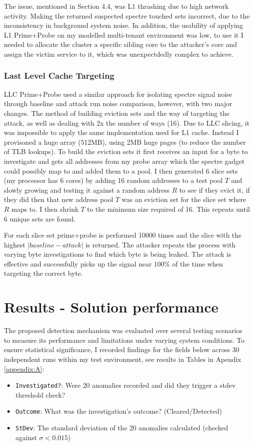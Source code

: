 \documentclass[11pt,a4paper, notitlepage]{article}
\begin{document}
The issue, mentioned in Section 4.4, was L1 thrashing due to high network activity. Making the returned suspected spectre touched sets incorrect, due to the 
inconsistency in background system noise. In addition, the usability of applying L1 Prime+Probe on my modelled multi-tenant environment was low, to use it I needed 
to allocate the cluster a specific sibling core to the attacker's core and assign the victim service to it, which was unexpectdedly complex to achieve.
\subsubsection{Last Level Cache Targeting}
LLC Prime+Probe used a similar approach for isolating spectre signal noise through baseline and attack run noise comparison, however, with two major changes.
The method of building eviction sets and the way of targeting the attack, as well as dealing with 2x the number of ways (16). Due to LLC slicing, it was impossible to apply the same implementation used for
L1 cache. Instead I provisoned a huge array (512MB), using 2MB huge pages (to reduce the number of TLB lookups). To build the eviction sets it 
first receives an input for a byte to investigate and gets all addresses from my probe array which the spectre gadget could possibly map to and added them to a pool. 
I then generated 6 slice sets (my processor has 6 cores) by adding 16 random addresses to a test pool $T$ and slowly growing and testing it against a random address $R$ to see if they evict it,
if they did then that new address pool $T$ was an eviction set for the slice set where $R$ maps to. I then shrink $T$ to the minimum size required of 16. This repeats until 6 unique sets are found.

For each slice set prime+probe is performed 10000 times and the slice with the highest $|baseline - attack|$ is returned. The attacker repeats
the process with varying byte investigations to find which byte is being leaked. The attack is effective and successfully picks up the
signal near 100\% of the time when targeting the correct byte. 

\section{Results - Solution performance}
The proposed detection mechanism was evaluated over several testing scenarios to measure its performance and limitations under varying 
system conditions. To ensure statistical significance, I recorded findings for the fields below across 30 independent runs within my test
environment, see results in Tables in Apendix \ref{appendix:A}:
\smallskip
\begin{itemize}[nosep]
\item \texttt{Investigated?}: Were 20 anomalies recorded and did they trigger a stdev threshold check?
\item \texttt{Outcome}: What was the investigation's outcome? (Cleared/Detected)
\item \texttt{StDev}: The standard deviation of the 20 anomalies calculated (checked against $\sigma < 0.015$)
\end{itemize}
\smallskip
\end{document}
